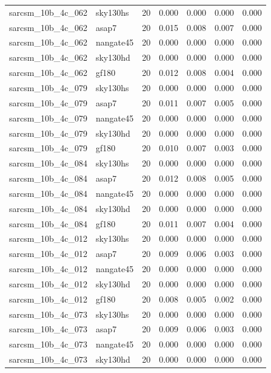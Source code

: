 \begin{tabular}{llrrrrr}
sarcsm\_10b\_4c\_062 & sky130hs & 20 & 0.000 & 0.000 & 0.000 & 0.000 \\
sarcsm\_10b\_4c\_062 & asap7 & 20 & 0.015 & 0.008 & 0.007 & 0.000 \\
sarcsm\_10b\_4c\_062 & nangate45 & 20 & 0.000 & 0.000 & 0.000 & 0.000 \\
sarcsm\_10b\_4c\_062 & sky130hd & 20 & 0.000 & 0.000 & 0.000 & 0.000 \\
sarcsm\_10b\_4c\_062 & gf180 & 20 & 0.012 & 0.008 & 0.004 & 0.000 \\
sarcsm\_10b\_4c\_079 & sky130hs & 20 & 0.000 & 0.000 & 0.000 & 0.000 \\
sarcsm\_10b\_4c\_079 & asap7 & 20 & 0.011 & 0.007 & 0.005 & 0.000 \\
sarcsm\_10b\_4c\_079 & nangate45 & 20 & 0.000 & 0.000 & 0.000 & 0.000 \\
sarcsm\_10b\_4c\_079 & sky130hd & 20 & 0.000 & 0.000 & 0.000 & 0.000 \\
sarcsm\_10b\_4c\_079 & gf180 & 20 & 0.010 & 0.007 & 0.003 & 0.000 \\
sarcsm\_10b\_4c\_084 & sky130hs & 20 & 0.000 & 0.000 & 0.000 & 0.000 \\
sarcsm\_10b\_4c\_084 & asap7 & 20 & 0.012 & 0.008 & 0.005 & 0.000 \\
sarcsm\_10b\_4c\_084 & nangate45 & 20 & 0.000 & 0.000 & 0.000 & 0.000 \\
sarcsm\_10b\_4c\_084 & sky130hd & 20 & 0.000 & 0.000 & 0.000 & 0.000 \\
sarcsm\_10b\_4c\_084 & gf180 & 20 & 0.011 & 0.007 & 0.004 & 0.000 \\
sarcsm\_10b\_4c\_012 & sky130hs & 20 & 0.000 & 0.000 & 0.000 & 0.000 \\
sarcsm\_10b\_4c\_012 & asap7 & 20 & 0.009 & 0.006 & 0.003 & 0.000 \\
sarcsm\_10b\_4c\_012 & nangate45 & 20 & 0.000 & 0.000 & 0.000 & 0.000 \\
sarcsm\_10b\_4c\_012 & sky130hd & 20 & 0.000 & 0.000 & 0.000 & 0.000 \\
sarcsm\_10b\_4c\_012 & gf180 & 20 & 0.008 & 0.005 & 0.002 & 0.000 \\
sarcsm\_10b\_4c\_073 & sky130hs & 20 & 0.000 & 0.000 & 0.000 & 0.000 \\
sarcsm\_10b\_4c\_073 & asap7 & 20 & 0.009 & 0.006 & 0.003 & 0.000 \\
sarcsm\_10b\_4c\_073 & nangate45 & 20 & 0.000 & 0.000 & 0.000 & 0.000 \\
sarcsm\_10b\_4c\_073 & sky130hd & 20 & 0.000 & 0.000 & 0.000 & 0.000 \\

\end{tabular}
